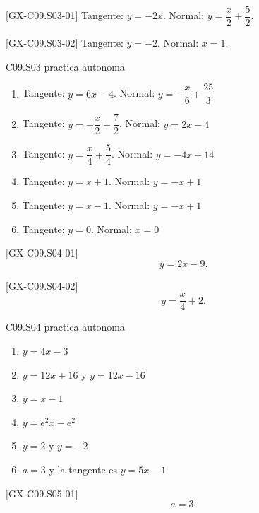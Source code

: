 \begin{shortanswer}{[GX-C09.S03-01]}
Tangente: \(y=-2x\). Normal: \(y=\dfrac{x}{2}+\dfrac{5}{2}\).
\end{shortanswer}

\begin{shortanswer}{[GX-C09.S03-02]}
Tangente: \(y=-2\). Normal: \(x=1\).
\end{shortanswer}

\begin{shortanswer}{C09.S03 practica autonoma}
\begin{enumerate}[label=\textbf{PX-C09.S03-\arabic*:}, leftmargin=*]
  \item Tangente: \(y=6x-4\). Normal: \(y=-\dfrac{x}{6}+\dfrac{25}{3}\)
  \item Tangente: \(y=-\dfrac{x}{2}+\dfrac{7}{2}\). Normal: \(y=2x-4\)
  \item Tangente: \(y=\dfrac{x}{4}+\dfrac{5}{4}\). Normal: \(y=-4x+14\)
  \item Tangente: \(y=x+1\). Normal: \(y=-x+1\)
  \item Tangente: \(y=x-1\). Normal: \(y=-x+1\)
  \item Tangente: \(y=0\). Normal: \(x=0\)
\end{enumerate}
\end{shortanswer}

\begin{shortanswer}{[GX-C09.S04-01]}
\[
y=2x-9.
\]
\end{shortanswer}

\begin{shortanswer}{[GX-C09.S04-02]}
\[
y=\frac{x}{4}+2.
\]
\end{shortanswer}

\begin{shortanswer}{C09.S04 practica autonoma}
\begin{enumerate}[label=\textbf{PX-C09.S04-\arabic*:}, leftmargin=*]
  \item \(y=4x-3\)
  \item \(y=12x+16\) y \(y=12x-16\)
  \item \(y=x-1\)
  \item \(y=e^2x-e^2\)
  \item \(y=2\) y \(y=-2\)
  \item \(a=3\) y la tangente es \(y=5x-1\)
\end{enumerate}
\end{shortanswer}

\begin{shortanswer}{[GX-C09.S05-01]}
\[
a=3.
\]
\end{shortanswer}

